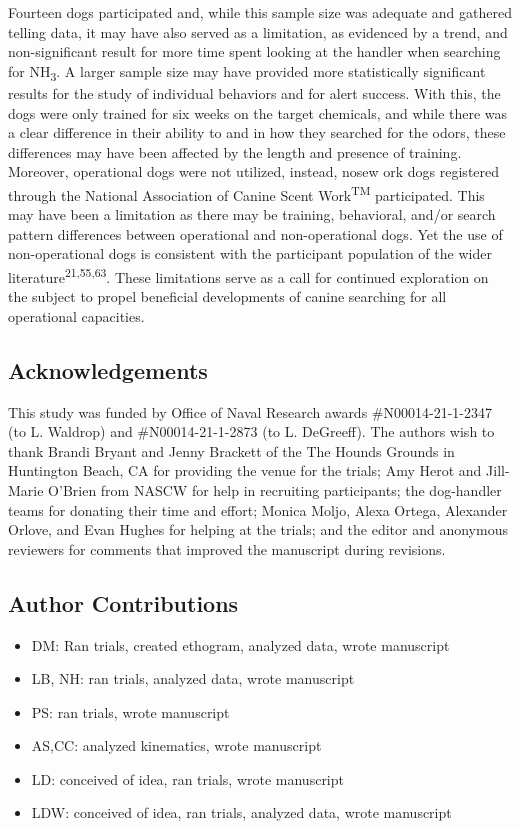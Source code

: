 \documentclass[
]{article}
\providecommand{\tightlist}{%
  \setlength{\itemsep}{0pt}\setlength{\parskip}{0pt}}
\begin{document}
Fourteen dogs participated and, while this sample size was adequate and gathered telling data, it may have also served as a limitation, as evidenced by a trend, and non-significant result for more time spent looking at the handler when searching for NH\textsubscript{3}. A larger sample size may have provided more statistically significant results for the study of individual behaviors and for alert success. With this, the dogs were only trained for six weeks on the target chemicals, and while there was a clear difference in their ability to and in how they searched for the odors, these differences may have been affected by the length and presence of training. Moreover, operational dogs were not utilized, instead, nosew ork dogs registered through the National Association of Canine Scent Work\textsuperscript{TM} participated. This may have been a limitation as there may be training, behavioral, and/or search pattern differences between operational and non-operational dogs. Yet the use of non-operational dogs is consistent with the participant population of the wider literature\textsuperscript{21,55,63}. These limitations serve as a call for continued exploration on the subject to propel beneficial developments of canine searching for all operational capacities.

\hypertarget{acknowledgements}{%
\subsection{Acknowledgements}\label{acknowledgements}}

This study was funded by Office of Naval Research awards \#N00014-21-1-2347 (to L. Waldrop) and \#N00014-21-1-2873 (to L. DeGreeff). The authors wish to thank Brandi Bryant and Jenny Brackett of the The Hounds Grounds in Huntington Beach, CA for providing the venue for the trials; Amy Herot and Jill-Marie O'Brien from NASCW for help in recruiting participants; the dog-handler teams for donating their time and effort; Monica Moljo, Alexa Ortega, Alexander Orlove, and Evan Hughes for helping at the trials; and the editor and anonymous reviewers for comments that improved the manuscript during revisions.

\hypertarget{author-contributions}{%
\subsection{Author Contributions}\label{author-contributions}}

\begin{itemize}
\tightlist
\item
  DM: Ran trials, created ethogram, analyzed data, wrote manuscript
\item
  LB, NH: ran trials, analyzed data, wrote manuscript
\item
  PS: ran trials, wrote manuscript
\item
  AS,CC: analyzed kinematics, wrote manuscript
\item
  LD: conceived of idea, ran trials, wrote manuscript
\item
  LDW: conceived of idea, ran trials, analyzed data, wrote manuscript
\end{itemize}
\end{document}
